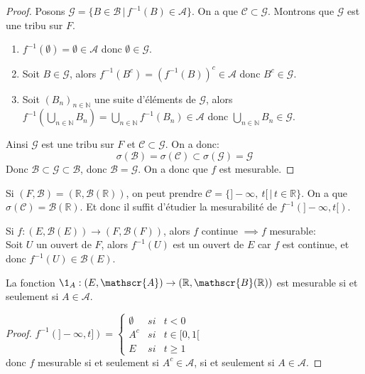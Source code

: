 \begin{proof}
	Posons $\mathscr{G} = \{ B \in \mathscr{B} \, | \, f^{-1}(B) \in \mathscr{A} \}$. On a que $\mathscr{C} \subset \mathscr{G}$.
	Montrons que $\mathscr{G}$ est une tribu sur $F$.
	\begin{enumerate}
		\item $f^{-1}(\emptyset) = \emptyset \in \mathscr{A}$ donc $\emptyset \in \mathscr{G}$.
		\item Soit $B \in \mathscr{G}$, alors $f^{-1}(B^c) = (f^{-1}(B))^c \in \mathscr{A}$ donc $B^c \in \mathscr{G}$.
		\item Soit $(B_n)_{n \in \mathbb{N}}$ une suite d'éléments de $\mathscr{G}$, alors
		      $f^{-1}(\bigcup\limits_{n \in \mathbb{N}} B_n) = \bigcup\limits_{n \in \mathbb{N}} f^{-1}(B_n) \in \mathscr{A}$ donc
		      $\bigcup\limits_{n \in \mathbb{N}} B_n \in \mathscr{G}$.
	\end{enumerate}
	Ainsi $\mathscr{G}$ est une tribu sur $F$ et $\mathscr{C} \subset \mathscr{G}$.
	On a donc:
	\[ \sigma(\mathscr{B}) = \sigma(\mathscr{C}) \subset \sigma(\mathscr{G}) = \mathscr{G} \]
	Donc $\mathscr{B} \subset \mathscr{G} \subset \mathscr{B}$, donc $\mathscr{B} = \mathscr{G}$.
	On a donc que $f$ est mesurable.
\end{proof}


\begin{example}[Application]
	Si $(F, \mathscr{B}) = (\mathbb{R}, \mathscr{B}(\mathbb{R}))$, on peut prendre $\mathscr{C} = \{ ]-\infty,\   t[ \, | \, t \in \mathbb{R} \}$. On a que
				$\sigma(\mathscr{C}) = \mathscr{B}(\mathbb{R})$. Et donc il suffit d'étudier la mesurabilité de $f^{-1}(]-\infty, t[)$.
\end{example}


\begin{remarque}
	Si $f : (E,\mathscr{B}(E)) \rightarrow (F,\mathscr{B}(F))$, alors $f$ continue $\implies f$ mesurable:\\
	Soit $U$ un ouvert de $F$, alors $f^{-1}(U)$ est un ouvert de $E$ car $f$ est continue, et donc $f^{-1}(U) \in \mathscr{B}(E)$.
\end{remarque}


\begin{prop}
	La fonction $\1_A : (E,\mathscr{A}) \rightarrow (\mathbb{R},\mathscr{B}(\mathbb{R}))$ est mesurable si et seulement si $A \in \mathscr{A}$.
\end{prop}

\begin{proof}
	$f^{-1}(]-\infty, t]) = \left\{ \begin{array}{crl}
			\emptyset & si & t < 0       \\
			A^c       & si & t \in [0,1[ \\
			E         & si & t \geq 1
		\end{array}
		\right.$\\
	donc $f$ mesurable si et seulement si $A^c\in \mathscr{A}$, si et seulement si $A\in \mathscr{A}$.
\end{proof}

